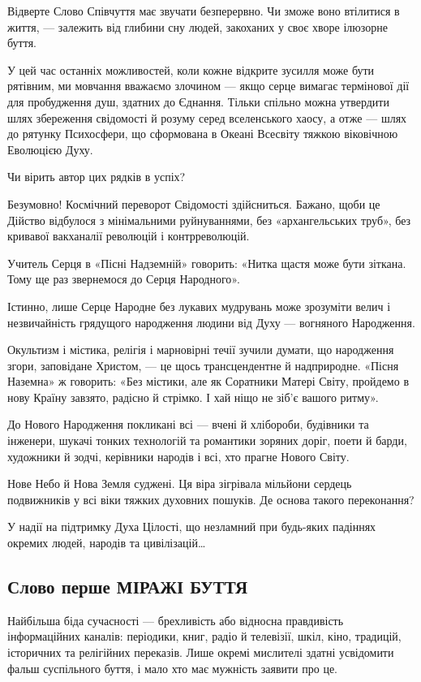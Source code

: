 Відверте Слово Співчуття має звучати безперервно. Чи зможе воно втілитися в
життя, — залежить від глибини сну людей, закоханих у своє хворе ілюзорне буття.

У цей час останніх можливостей, коли кожне відкрите зусилля може бути рятівним,
ми мовчання вважаємо злочином — якщо серце вимагає термінової дії для
пробудження душ, здатних до Єднання. Тільки спільно можна утвердити шлях
збереження свідомості й розуму серед вселенського хаосу, а отже — шлях до
рятунку Психосфери, що сформована в Океані Всесвіту тяжкою віковічною Еволюцією
Духу.

Чи вірить автор цих рядків в успіх?

Безумовно! Космічний переворот Свідомості здійсниться. Бажано, щоби це Дійство
відбулося з мінімальними руйнуваннями, без «архангельських труб», без кривавої
вакханалії революцій і контрреволюцій.

Учитель Серця в «Пісні Надземній» говорить: «Нитка щастя може бути зіткана.
Тому ще раз звернемося до Серця Народного».

Істинно, лише Серце Народне без лукавих мудрувань може зрозуміти велич і
незвичайність грядущого народження людини від Духу — вогняного Народження.

Окультизм і містика, релігія і марновірні течії зучили думати, що народження
згори, заповідане Христом, — це щось трансцендентне й надприродне. «Пісня
Наземна» ж говорить: «Без містики, але як Соратники Матері Світу, пройдемо в
нову Країну завзято, радісно й стрімко. І хай ніщо не зіб’є вашого ритму».

До Нового Народження покликані всі — вчені й хлібороби, будівники та інженери,
шукачі тонких технологій та романтики зоряних доріг, поети й барди, художники й
зодчі, керівники народів і всі, хто прагне Нового Світу.

Нове Небо й Нова Земля суджені. Ця віра зігрівала мільйони сердець подвижників
у всі віки тяжких духовних пошуків. Де основа такого переконання?

У надії на підтримку Духа Цілості, що незламний при будь-яких падіннях окремих
людей, народів та цивілізацій…

\subsection{Слово перше МІРАЖІ БУТТЯ}

Найбільша біда сучасності — брехливість або відносна правдивість інформаційних
каналів: періодики, книг, радіо й телевізії, шкіл, кіно, традицій, історичних
та релігійних переказів. Лише окремі мислителі здатні усвідомити фальш
суспільного буття, і мало хто має мужність заявити про це.

